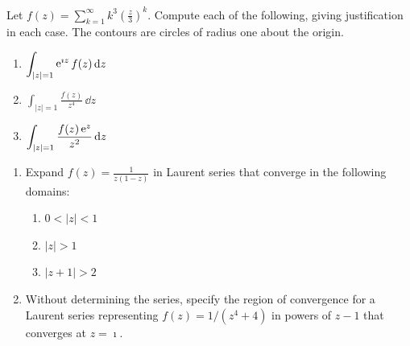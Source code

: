 {\begin{Exercise}
\end{Exercise}


\begin{Exercise}
  \label{exercise sum k^3 (z/3)^k}
  Let $f(z) = \sum_{k = 1}^\infty k^3 \left( \frac{z}{3} \right)^k$.
  Compute each of the following, giving justification in each
  case.  The contours are circles of radius one about the origin.
  \begin{enumerate}
  \item $\displaystyle \int_{|z| = 1} \mathop{\mathrm{e}}\nolimits^{\imath z} f(z)\,\mathrm{d} z$
  \item $\displaystyle \int_{|z| = 1} \frac{f(z)}{z^4}\,\dd z$
  \item $\displaystyle \int_{|z| = 1} \frac{f(z) \mathop{\mathrm{e}}\nolimits^z}{z^2}\,\mathrm{d} z$
  \end{enumerate}

\end{Exercise}


\begin{Exercise}
  \label{exercise laurent 1z1z}
  \begin{enumerate}
  \item 
    Expand $f(z) = \frac{1}{z (1 - z)}$ in Laurent series that
    converge in the following domains:
    \begin{enumerate}
    \item 
      $0 < |z| < 1$
    \item 
      $|z| > 1$
    \item 
      $|z + 1| > 2$
    \end{enumerate}
  \item 
    Without determining the series, specify the region of
    convergence for a Laurent series representing 
    $f(z) = 1/(z^4 + 4)$ in powers of $z - 1$ that converges at $z = \imath$.
  \end{enumerate}

\end{Exercise}









\raggedbottom
}

